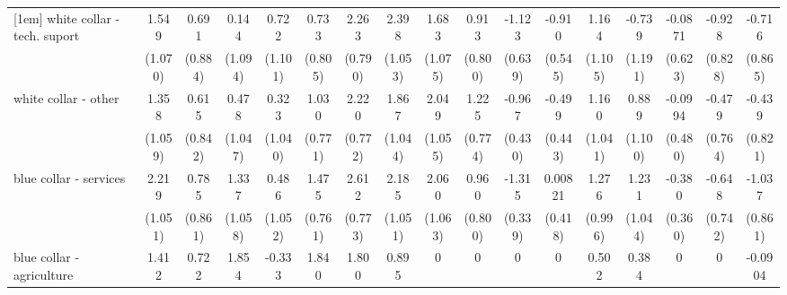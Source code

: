 {\begin{tabular}{l*{16}{c}}
[1em]
white collar - tech. suport&       1.549         &       0.691         &       0.144         &       0.722         &       0.733         &       2.263\sym{**} &       2.398\sym{*}  &       1.683         &       0.913         &      -1.123         &      -0.910         &       1.164         &      -0.739         &     -0.0871         &      -0.928         &      -0.716         \\
                    &     (1.070)         &     (0.884)         &     (1.094)         &     (1.101)         &     (0.805)         &     (0.790)         &     (1.053)         &     (1.075)         &     (0.800)         &     (0.639)         &     (0.545)         &     (1.105)         &     (1.191)         &     (0.623)         &     (0.828)         &     (0.865)         \\
[1em]
white collar - other&       1.358         &       0.615         &       0.478         &       0.323         &       1.030         &       2.220\sym{**} &       1.867         &       2.049         &       1.225         &      -0.967\sym{*}  &      -0.499         &       1.160         &       0.889         &     -0.0994         &      -0.479         &      -0.439         \\
                    &     (1.059)         &     (0.842)         &     (1.047)         &     (1.040)         &     (0.771)         &     (0.772)         &     (1.044)         &     (1.055)         &     (0.774)         &     (0.430)         &     (0.443)         &     (1.041)         &     (1.100)         &     (0.480)         &     (0.764)         &     (0.821)         \\
[1em]
blue collar - services&       2.219\sym{*}  &       0.785         &       1.337         &       0.486         &       1.475         &       2.612\sym{***}&       2.185\sym{*}  &       2.060         &       0.960         &      -1.315\sym{***}&     0.00821         &       1.276         &       1.231         &      -0.380         &      -0.648         &      -1.037         \\
                    &     (1.051)         &     (0.861)         &     (1.058)         &     (1.052)         &     (0.761)         &     (0.773)         &     (1.051)         &     (1.063)         &     (0.800)         &     (0.339)         &     (0.418)         &     (0.996)         &     (1.044)         &     (0.360)         &     (0.742)         &     (0.861)         \\
[1em]
blue collar - agriculture&       1.412         &       0.722         &       1.854         &      -0.333         &       1.840         &       1.800         &       0.895         &           0         &           0         &           0         &           0         &       0.502         &       0.384         &           0         &           0         &     -0.0904         \\

\end{tabular}}
